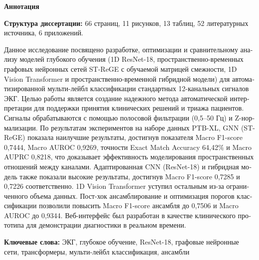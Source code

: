 \documentclass[12pt,a4paper]{article}
\begin{document}
\begin{otherlanguage}{russian}
\begin{center}
    \large\textbf{Аннотация}
\end{center}
\vspace{0.3cm}

\noindent \textbf{Структура диссертации:} 66 страниц, 11 рисунков, 13 таблиц, 52 литературных источника, 6 приложений.
\vspace{0.3cm}

Данное исследование посвящено разработке, оптимизации и сравнительному анализу моделей глубокого обучения (1D ResNet-18, пространственно-временных графовых нейронных сетей ST-ReGE с обучаемой матрицей смежности, 1D Vision Transformer и пространственно-временной гибридной модели) для автоматизированной мульти-лейбл классификации стандартных 12-канальных сигналов ЭКГ. Целью работы является создание надежного метода автоматической интерпретации для поддержки принятия клинических решений и триажа пациентов. Сигналы обрабатываются с помощью полосовой фильтрации (0,5--50 Гц) и Z-нормализации. По результатам экспериментов на наборе данных PTB-XL, GNN (ST-ReGE) показала наилучшие результаты, достигнув показателя Macro F1-score 0,7444, Macro AUROC 0,9269, точности Exact Match Accuracy 64,42\% и Macro AUPRC 0,8218, что доказывает эффективность моделирования пространственных отношений между каналами. Адаптированная CNN (ResNet-18) и гибридная модель также показали высокие результаты, достигнув Macro F1-score 0,7285 и 0,7226 соответственно. 1D Vision Transformer уступил остальным из-за ограниченного объема данных. Пост-хок ансамблирование и оптимизация порогов классификации позволили повысить Macro F1-score ансамбля до 0,7506 и Macro AUROC до 0,9344. Веб-интерфейс был разработан в качестве клинического прототипа для демонстрации диагностики в реальном времени.

\vspace{0.8cm}
\noindent\textbf{Ключевые слова:} ЭКГ, глубокое обучение, ResNet-18, графовые нейронные сети, трансформеры, мульти-лейбл классификация, ансамбли
\end{otherlanguage}

\clearpage
\end{document}
